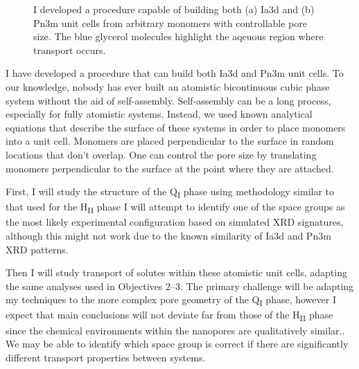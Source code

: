 \documentclass{article}
\begin{document}
\begin{figure}
\begin{subfigure}{0.49\linewidth}
  \caption{}\label{fig:pn3m}
  \end{subfigure}
  \caption{I developed a procedure capable of building both (a) Ia3d and (b) Pn3m
  unit cells from arbitrary monomers with controllable pore size. The blue
  glycerol molecules highlight the aqeuous region where transport occurs.}\label{fig:q1_unitcells}
  \vspace{-0.5cm}
  \end{figure}
  
  I have developed a procedure that can build both Ia3d and Pn3m unit cells.
  To our knowledge, nobody has ever built an atomistic bicontinuous cubic 
  phase system without the aid of self-assembly. Self-assembly can be a long
  process, especially for fully atomistic systems. 
  Instead, we used known
  analytical equations that describe the surface of these systems in order 
  to place monomers into a unit cell. Monomers are placed perpendicular to
  the surface in random locations that don't overlap. One can control the 
  pore size by translating monomers perpendicular to the surface at the 
  point where they are attached.
  
  First, I will study the structure of the Q\textsubscript{I} phase using
  methodology similar to that used for the H\textsubscript{II} phase 
  I will attempt to identify one of the space groups as the most likely
  experimental configuration based on simulated XRD signatures, although
  this might not work due to the known similarity of Ia3d and Pn3m XRD 
  patterns. %
  
  Then I will study transport of solutes within these atomistic unit cells, 
  adapting the same analyses used in Objectives 2--3. The primary 
  challenge will be adapting my techniques to the more complex pore geometry
  of the Q\textsubscript{I} phase, however I expect that main conclusions
  will not deviate far from those of the H\textsubscript{II} phase since
  the chemical environments within the nanopores are qualitatively similar.. We may be 
  able to identify which space group is correct if there are significantly
  different transport properties between systems.

\end{document}

